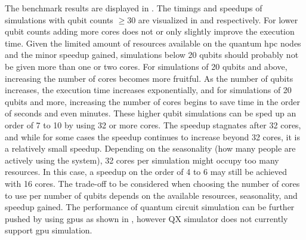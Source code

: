 The benchmark results are displayed in .
The timings and speedups of simulations with qubit counts $\ge 30$ are visualized in  and  respectively.
For lower qubit counts adding more cores does not or only slightly improve the execution time.
Given the limited amount of resources available on the quantum \gls{hpc} nodes and the minor speedup gained, simulations below 20 qubits should probably not be given more than one or two cores.
For simulations of 20 qubits and above, increasing the number of cores becomes more fruitful.
As the number of qubits increases, the execution time increases exponentially, and for simulations of 20 qubits and more, increasing the number of cores begins to save time in the order of seconds and even minutes.
These higher qubit simulations can be sped up an order of 7 to 10 by using 32 or more cores.
The speedup stagnates after 32 cores, and while for some cases the speedup continues to increase beyond 32 cores, it is a relatively small speedup.
Depending on the seasonality (how many people are actively using the system), 32 cores per simulation might occupy too many resources.
In this case, a speedup on the order of 4 to 6 may still be achieved with 16 cores.
The trade-off to be considered when choosing the number of cores to use per number of qubits depends on the available resources, seasonality, and speedup gained.
The performance of quantum circuit simulation can be further pushed by using \glspl{gpu} as shown in \cite[Appendix B]{oud2019simulation}, however QX simulator does not currently support \gls{gpu} simulation.

\clearpage

